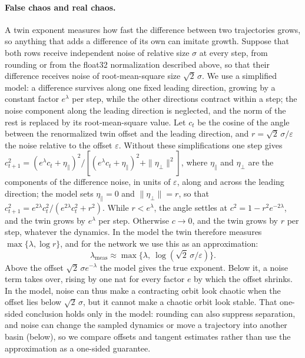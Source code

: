 \documentclass[11pt,letterpaper]{article}
\begin{document}
\paragraph{False chaos and real chaos.} A twin exponent measures how fast the difference between two trajectories
grows, so anything that adds a difference of its own can imitate growth. Suppose that both rows receive independent
noise of relative size $\sigma$ at every step, from rounding or from the float32 normalization described above, so
that their difference receives noise of root-mean-square size $\sqrt2\,\sigma$. We use a simplified model: a
difference survives along one fixed leading direction, growing by a constant factor $e^{\lambda}$ per step, while the
other directions contract within a step; the noise component along the leading direction is neglected, and the norm
of the rest is replaced by its root-mean-square value. Let $c_t$ be the cosine of the angle between the renormalized
twin offset and the leading direction, and $r=\sqrt2\,\sigma/\varepsilon$ the noise relative to the offset
$\varepsilon$. Without these simplifications one step gives
$c_{t+1}^2=(e^{\lambda}c_t+\eta_\parallel)^2/[(e^{\lambda}c_t+\eta_\parallel)^2+\|\eta_\perp\|^2]$, where
$\eta_\parallel$ and $\eta_\perp$ are the components of the difference noise, in units of $\varepsilon$, along and
across the leading direction; the model sets $\eta_\parallel=0$ and $\|\eta_\perp\|=r$, so that
$c_{t+1}^2=e^{2\lambda}c_t^2/(e^{2\lambda}c_t^2+r^2)$. While $r<e^{\lambda}$, the angle settles at
$c^2=1-r^2e^{-2\lambda}$, and the twin grows by $e^{\lambda}$ per step. Otherwise $c\to0$, and the twin grows by $r$
per step, whatever the dynamics. In the model the twin therefore measures $\max\{\lambda,\log r\}$, and for the
network we use this as an approximation:
\begin{equation}
  \lambda_{\mathrm{meas}}\approx\max\bigl\{\lambda,\ \log(\sqrt2\,\sigma/\varepsilon)\bigr\}.
  \label{eq:falsechaos}
\end{equation}
Above the offset $\sqrt2\,\sigma e^{-\lambda}$ the model gives the true exponent. Below it, a noise term takes over,
rising by one nat for every factor $e$ by which the offset shrinks. In the model, noise can thus make a contracting
orbit look chaotic when the offset lies below $\sqrt2\,\sigma$, but it cannot make a chaotic orbit look stable. That
one-sided conclusion holds only in the model: rounding can also suppress separation, and noise can change the sampled
dynamics or move a trajectory into another basin (below), so we compare offsets and tangent estimates rather than use
the approximation as a one-sided guarantee.
\end{document}
